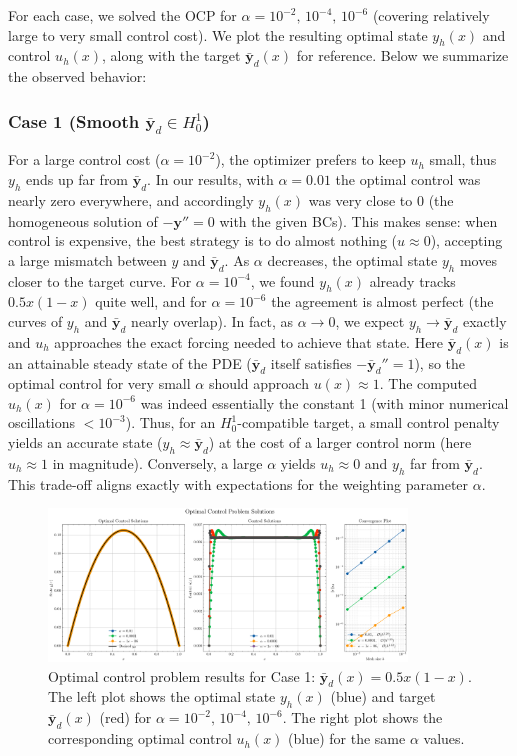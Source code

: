 For each case, we solved the OCP for $\alpha = 10^{-2},\,10^{-4},\,10^{-6}$ (covering relatively large to very small control cost). We plot the resulting optimal state $y_h(x)$ and control $u_h(x)$, along with the target $\bar{\mathbf{y}}_d(x)$ for reference. Below we summarize the observed behavior:

\subsubsection*{Case 1 (Smooth $\bar{\mathbf{y}}_d \in H^1_0$)}
For a large control cost ($\alpha=10^{-2}$), the optimizer prefers to keep $u_h$ small, thus $y_h$ ends up far from $\bar{\mathbf{y}}_d$. In our results, with $\alpha=0.01$ the optimal control was nearly zero everywhere, and accordingly $y_h(x)$ was very close to 0 (the homogeneous solution of $-\mathbf{y}''=0$ with the given BCs).
This makes sense: when control is expensive, the best strategy is to do almost nothing ($u\approx0$), accepting a large mismatch between $y$ and $\bar{\mathbf{y}}_d$.
As $\alpha$ decreases, the optimal state $y_h$ moves closer to the target curve. For $\alpha=10^{-4}$, we found $y_h(x)$ already tracks $0.5x(1-x)$ quite well, and for $\alpha=10^{-6}$ the agreement is almost perfect (the curves of $y_h$ and $\bar{\mathbf{y}}_d$ nearly overlap). In fact, as $\alpha\to 0$, we expect $y_h\to \bar{\mathbf{y}}_d$ exactly and $u_h$ approaches the exact forcing needed to achieve that state. Here $\bar{\mathbf{y}}_d(x)$ is an attainable steady state of the PDE ($\bar{\mathbf{y}}_d$ itself satisfies $-\bar{\mathbf{y}}_d'' = 1$), so the optimal control for very small $\alpha$ should approach $u(x)\approx 1$. The computed $u_h(x)$ for $\alpha=10^{-6}$ was indeed essentially the constant 1 (with minor numerical oscillations $<10^{-3}$). Thus, for an $H^1_0$-compatible target, a small control penalty yields an accurate state ($y_h \approx \bar{\mathbf{y}}_d$) at the cost of a larger control norm (here $u_h\approx 1$ in magnitude). Conversely, a large $\alpha$ yields $u_h\approx 0$ and $y_h$ far from $\bar{\mathbf{y}}_d$. This trade-off aligns exactly with expectations for the weighting parameter $\alpha$.
\begin{figure}[H]
	\centering
	\includegraphics[width=0.85\textwidth]{figures/opt_control_plot_Case 1.png}
	\caption{Optimal control problem results for Case 1: $\bar{\mathbf{y}}_d(x)=0.5x(1-x)$. The left plot shows the optimal state $y_h(x)$ (blue) and target $\bar{\mathbf{y}}_d(x)$ (red) for $\alpha=10^{-2},\,10^{-4},\,10^{-6}$. The right plot shows the corresponding optimal control $u_h(x)$ (blue) for the same $\alpha$ values.}
	\label{fig:opt_control_case1}
\end{figure}


